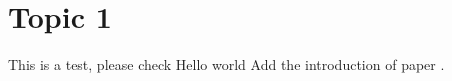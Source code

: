 \section{Topic 1}
This is a test, please check
Hello world
Add the introduction of paper \cite{pcb}.
